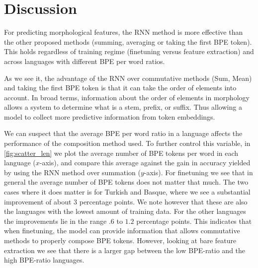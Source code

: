 \documentclass[11pt]{article}
\newcommand\adam[1]{(\textbf{Adam:} #1)}
\begin{document}
	\section{Discussion}

        For predicting morphological features, the RNN method is more
     effective than the other proposed methods (summing, averaging or
     taking the first BPE token). This holds regardless of training
     regime (finetuning versus feature extraction) and across
     languages with different BPE per word ratios.
    
                 As we see it, the advantage of the RNN over
     commutative methods (Sum, Mean) and taking the first BPE token is
     that it can take the order of elements into account. In broad
     terms, information about the order of elements in morphology
     allows a system to determine what is a stem, prefix, or suffix.
      Thus allowing a model to collect more predictive information
     from token embeddings.

                 We can suspect that the average BPE per word ratio in
     a language affects the performance of the composition method
     used. To further control this variable, in \cref{fig:scatter_len}
     we plot the average number of BPE tokens per word in each
     language ($x$-axis), and compare this average against the gain in
     accuracy yielded by using the RNN method over summation
     ($y$-axis).  For finetuning we see that in general the average
     number of BPE tokens does not matter that much. The two cases
     where it does matter is for Turkish and Basque, where we see a
     substantial improvement of about $3$ percentage points. We note
     however that these are also the languages with the lowest amount
     of training data.
        For the other languages the improvements lie in the range $.6$
     to $1.2$ percentage points. This indicates that when finetuning,
     the model can provide information that allows commutative methods
     to properly compose BPE tokens. However, looking at bare feature
     extraction we see that there is a larger gap between the low
     BPE-ratio and the high BPE-ratio languages.
\end{document}
